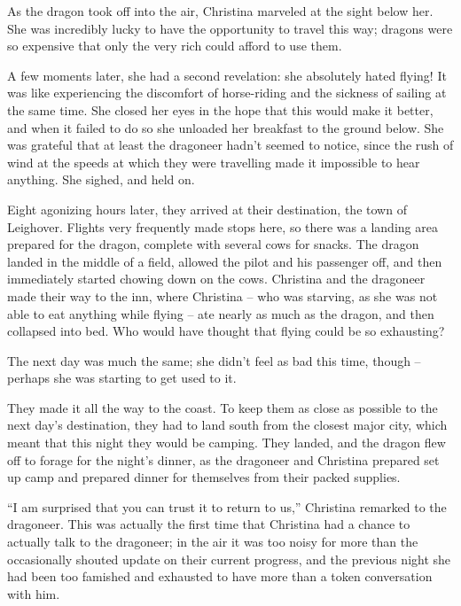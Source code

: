 \documentclass[showtrims,b6paper,draft,10pt]{memoir}
\begin{document}
As the dragon took off into the air, Christina marveled at the sight below her.  She was incredibly lucky to have the opportunity to travel this way;  dragons were so expensive that only the very rich could afford to use them.

A few moments later, she had a second revelation:  she absolutely hated flying!  It was like experiencing the discomfort of horse-riding and the sickness of sailing at the same time.  She closed her eyes in the hope that this would make it better, and when it failed to do so she unloaded her breakfast to the ground below.  She was grateful that at least the dragoneer hadn't seemed to notice, since the rush of wind at the speeds at which they were travelling made it impossible to hear anything.  She sighed, and held on.

Eight agonizing hours later, they arrived at their destination, the town of Leighover.  Flights very frequently made stops here, so there was a landing area prepared for the dragon, complete with several cows for snacks.  The dragon landed in the middle of a field, allowed the pilot and his passenger off, and then immediately started chowing down on the cows.  Christina and the dragoneer made their way to the inn, where Christina -- who was starving, as she was not able to eat anything while flying -- ate nearly as much as the dragon, and then collapsed into bed.  Who would have thought that flying could be so exhausting?

The next day was much the same;  she didn't feel as bad this time, though -- perhaps she was starting to get used to it.

They made it all the way to the coast.  To keep them as close as possible to the next day's destination, they had to land south from the closest major city, which meant that this night they would be camping.  They landed, and the dragon flew off to forage for the night's dinner, as the dragoneer and Christina prepared set up camp and prepared dinner for themselves from their packed supplies.

``I am surprised that you can trust it to return to us,''  Christina remarked to the dragoneer.  This was actually the first time that Christina had a chance to actually talk to the dragoneer;  in the air it was too noisy for more than the occasionally shouted update on their current progress, and the previous night she had been too famished and exhausted to have more than a token conversation with him.
\end{document}
